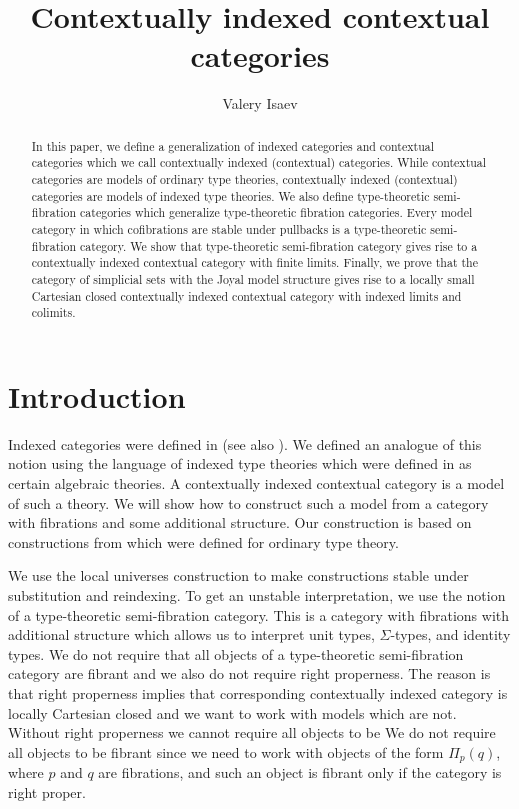 \documentclass[reqno]{amsart}
\theoremstyle{definition}
\theoremstyle{remark}
\numberwithin{figure}{section}
\begin{document}
\title{Contextually indexed contextual categories}

\author{Valery Isaev}

\begin{abstract}
In this paper, we define a generalization of indexed categories and contextual categories which we call contextually indexed (contextual) categories.
While contextual categories are models of ordinary type theories, contextually indexed (contextual) categories are models of indexed type theories.
We also define type-theoretic semi-fibration categories which generalize type-theoretic fibration categories.
Every model category in which cofibrations are stable under pullbacks is a type-theoretic semi-fibration category.
We show that type-theoretic semi-fibration category gives rise to a contextually indexed contextual category with finite limits.
Finally, we prove that the category of simplicial sets with the Joyal model structure gives rise to a locally small Cartesian closed contextually indexed contextual category with indexed limits and colimits.
\end{abstract}

\maketitle

\section{Introduction}

Indexed categories were defined in \cite{indexed-cats} (see also \cite[B1]{elephant}).
We defined an analogue of this notion using the language of indexed type theories which were defined in \cite{indexed-tt} as certain algebraic theories.
A contextually indexed contextual category is a model of such a theory.
We will show how to construct such a model from a category with fibrations and some additional structure.
Our construction is based on constructions from \cite{shul-inv,local-universes} which were defined for ordinary type theory.

We use the local universes construction to make constructions stable under substitution and reindexing.
To get an unstable interpretation, we use the notion of a type-theoretic semi-fibration category.
This is a category with fibrations with additional structure which allows us to interpret unit types, $\Sigma$-types, and identity types.
We do not require that all objects of a type-theoretic semi-fibration category are fibrant and we also do not require right properness.
The reason is that right properness implies that corresponding contextually indexed category is locally Cartesian closed and we want to work with models which are not.
Without right properness we cannot require all objects to be
We do not require all objects to be fibrant since we need to work with objects of the form $\Pi_p(q)$, where $p$ and $q$ are fibrations, and such an object is fibrant only if the category is right proper.
\end{document}
